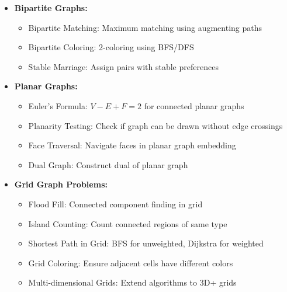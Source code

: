 \documentclass[a4paper,10pt]{book}
\begin{document}
\begin{itemize}[leftmargin=*]
    \item \textbf{Bipartite Graphs:}
    \begin{itemize}
        \item Bipartite Matching: Maximum matching using augmenting paths
        
        \item Bipartite Coloring: 2-coloring using BFS/DFS
        \item Stable Marriage: Assign pairs with stable preferences
    \end{itemize}

    \item \textbf{Planar Graphs:}
    \begin{itemize}
        \item Euler's Formula: $V - E + F = 2$ for connected planar graphs
        \item Planarity Testing: Check if graph can be drawn without edge crossings
        \item Face Traversal: Navigate faces in planar graph embedding
        \item Dual Graph: Construct dual of planar graph
    \end{itemize}
\end{itemize}
\begin{itemize}[leftmargin=*]
    \item \textbf{Grid Graph Problems:}
    \begin{itemize}
        \item Flood Fill: Connected component finding in grid
        \item Island Counting: Count connected regions of same type
        \item Shortest Path in Grid: BFS for unweighted, Dijkstra for weighted
        \item Grid Coloring: Ensure adjacent cells have different colors
        \item Multi-dimensional Grids: Extend algorithms to 3D+ grids
    \end{itemize}
\end{itemize}
\end{document}
